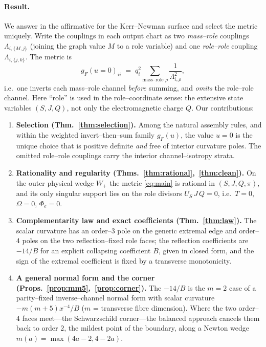 \documentclass[11pt]{article}
\newcommand{\Wp}{W_{+}}
\begin{document}
\paragraph{Result.}
We answer in the affirmative for the Kerr--Newman surface and select the metric uniquely.
Write the couplings in each output chart as two \emph{mass--role} couplings
$\Lambda_{i,\{M,j\}}$ (joining the graph value $M$ to a role variable) and one
\emph{role--role} coupling $\Lambda_{i,\{j,k\}}$. The metric is
\begin{equation}
g_F(u{=}0)_{ii}\;=\;q_i^2\sum_{\text{mass--role }\rho}\frac{1}{\Lambda_{i,\rho}^2},
\label{eq:main}
\end{equation}
i.e.\ one inverts each mass--role channel \emph{before} summing, and \emph{omits} the
role--role channel. Here ``role'' is used in the role--coordinate sense: the extensive state
variables $(S,J,Q)$, not only the electromagnetic charge $Q$. Our contributions:
\begin{enumerate}
\item \textbf{Selection (Thm.~\ref{thm:selection}).} Among the natural assembly rules, and
within the weighted invert--then--sum family $g_F(u)$, the value $u=0$ is the unique choice
that is positive definite \emph{and} free of interior curvature poles. The omitted role--role
couplings carry the interior channel--isotropy strata.
\item \textbf{Rationality and regularity (Thms.~\ref{thm:rational},~\ref{thm:clean}).} On the
outer physical wedge $\Wp$ the metric \eqref{eq:main} is rational in $(S,J,Q,\pi)$, and its
only singular support lies on the role divisors $U_S\,J\,Q=0$, i.e.\ $T=0$, $\Omega=0$,
$\Phi_e=0$.
\item \textbf{Complementarity law and exact coefficients (Thm.~\ref{thm:law}).} The scalar
curvature has an order--$3$ pole on the generic extremal edge and order--$4$ poles on the two
reflection--fixed role faces; the reflection coefficients are $-14/B$ for an explicit
collapsing coefficient $B$, given in closed form, and the sign of the extremal coefficient is
fixed by a transverse monotonicity.
\item \textbf{A general normal form and the corner (Props.~\ref{prop:mm5},~\ref{prop:corner}).}
The $-14/B$ is the $m=2$ case of a parity--fixed inverse--channel normal form with scalar
curvature $-m(m+5)x^{-4}/B$ ($m$ = transverse fibre dimension). Where the two order--$4$ faces
meet---the Schwarzschild corner---the balanced approach cancels them back to order $2$, the
mildest point of the boundary, along a Newton wedge $m(a)=\max(4a-2,4-2a)$.
\end{enumerate}
\end{document}
